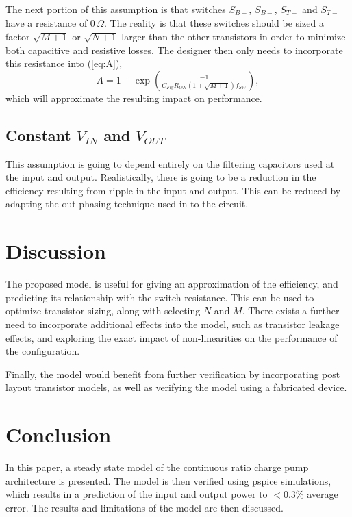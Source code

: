 \documentclass[conference]{IEEEtran}
\begin{document}
 	The next portion of this assumption is that switches $S_{B+}$, $S_{B-}$, $S_{T+}$ and $S_{T-}$ have a resistance of 0$\,\Omega$. The reality is that these switches should be sized a factor $\sqrt{M+1}$ or $\sqrt{N+1}$ larger than the other transistors in order to minimize both capacitive and resistive losses. The designer then only needs to incorporate this resistance into (\ref{eq:A}), 
 	\begin{equation}
 	A = 1-\exp\left(\tfrac{-1}{C_{Fly}R_{ON}(1+\sqrt{M+1}) f_{SW}}\right),
 	\end{equation}
 	which will approximate the resulting impact on performance.
 	\subsection{Constant $V_{IN}$ and $V_{OUT}$}
 	This assumption is going to depend entirely on the filtering capacitors used at the input and output. Realistically, there is going to be a reduction in the efficiency resulting from ripple in the input and output. This can be reduced by adapting the out-phasing technique used in \cite{Le2010} to the circuit.
 	
 	\section{Discussion}
 	The proposed model is useful for giving an approximation of the efficiency, and predicting its relationship with the switch resistance. This can be used to optimize transistor sizing, along with selecting $N$ and $M$. There exists a further need to incorporate additional effects into the model, such as transistor leakage effects, and exploring the exact impact of non-linearities on the performance of the configuration. 
 	
 	Finally, the model would benefit from further verification by incorporating post layout transistor models, as well as verifying the model using a fabricated device.
 	
 	\section{Conclusion}
 	In this paper, a steady state model of the continuous ratio charge pump architecture is presented. The model is then verified using pspice simulations, which results in a prediction of the input and output power to $<$0.3\% average error. The results and limitations of the model are then discussed.
 	
 	
 	
\end{document}
